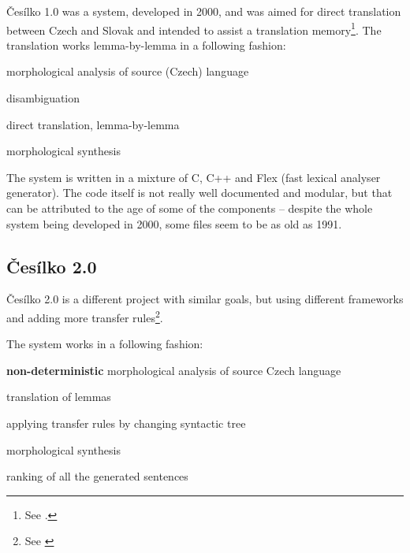 Česílko 1.0 was a system, developed in 2000, and was aimed for direct translation between Czech and Slovak and intended to assist a translation memory\footnote{See \cite{cesilko1}.}. The translation works lemma-by-lemma in a following fashion:
\begin{pitemize}
\item morphological analysis of source (Czech) language
\item disambiguation
\item direct translation, lemma-by-lemma
\item morphological synthesis
\end{pitemize}



The system is written in a mixture of C, C++ and Flex (fast lexical analyser generator). The code itself is not really well documented and modular, but that can be attributed to the age of some of the components -- despite the whole system being developed in 2000, some files seem to be as old as 1991.




\subsection{Česílko 2.0}
\label{cesilko20}
Česílko 2.0 is a different project with similar goals, but using different frameworks and adding more transfer rules\footnote{See \cite{cesilko2}}. 

The system works in a following fashion:
\begin{pitemize}
\item \textbf{non-deterministic} morphological analysis of source Czech language
\item translation of lemmas
\item applying transfer rules by changing syntactic tree
\item morphological synthesis
\item ranking of all the generated sentences
\end{pitemize}

